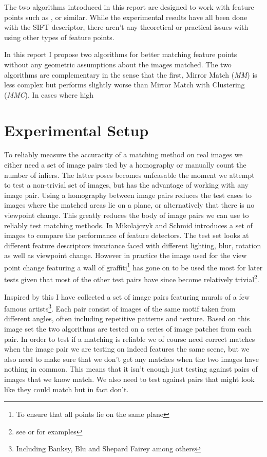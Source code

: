 \documentclass{article}
\begin{document}
The two algorithms introduced in this report are designed to work with 
feature points such as ,  or similar. While the experimental results 
have all been done with the SIFT descriptor, there aren't any 
theoretical or practical issues with using other types of feature 
points. 

In this report I propose two algorithms for better matching feature 
points without any geometric assumptions about the images matched. The 
two algorithms are complementary in the sense that the first, Mirror 
Match (\emph{MM}) is less complex but performs slightly worse than 
Mirror Match with Clustering (\emph{MMC}). In cases where high 


\section{Experimental Setup}
\label{experiment}

To reliably measure the accuracity of a matching method on real images 
we either need a set of image pairs tied by a homography or manually 
count the number of inliers. The latter poses becomes unfeasable the 
moment we attempt to test a non-trivial set of images, but has the 
advantage of working with any image pair. Using a homography between 
image pairs reduces the test cases to images where the matched areas lie 
on a plane, or alternatively that there is no viewpoint change. This 
greatly reduces the body of image pairs we can use to reliably test 
matching methods. In \cite{mikolaczyk2005performance} Mikolajczyk and 
Schmid introduces a set of images to compare the performance of feature 
detectors. The test set looks at different feature descriptors 
invariance faced with different lighting, blur, rotation as well as 
viewpoint change. However in practice the image used for the view point 
change featuring a wall of graffiti\footnote{To ensure that all points 
lie on the same plane} has gone on to be used the most for later tests 
given that most of the other test pairs have since become relatively 
trivial\footnote{see \cite{wu2011robust} or \cite{delponte2006svd} for 
examples}.

Inspired by this I have collected a set of image pairs featuring murals 
of a few famous artists\footnote{Including Banksy, Blu and Shepard 
Fairey among others}. Each pair consist of images of the same motif 
taken from different angles, often including repetitive patterns and 
texture. Based on this image set the two algorithms are tested on a 
series of image patches from each pair. In order to test if a matching 
is reliable we of course need correct matches when the image pair we are 
testing on indeed features the same scene, but we also need to make sure 
that we don't get any matches when the two images have nothing in 
common. This means that it isn't enough just testing against pairs of 
images that we know match. We also need to test against pairs that might 
look like they could match but in fact don't.
\end{document}
